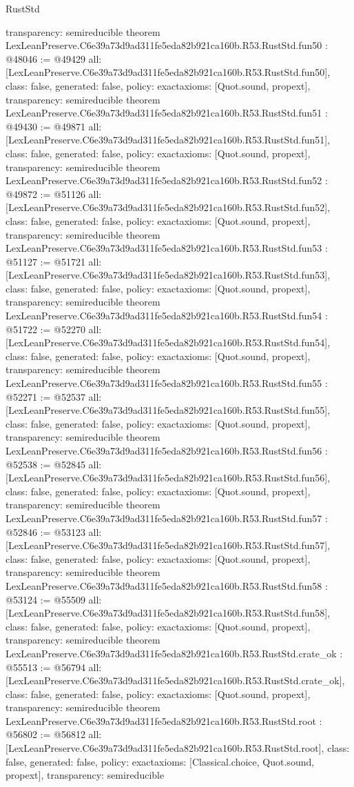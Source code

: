\begin{lexlean}{RustStd}
\begin{coremodule}
{  transparency: semireducible
}
theorem LexLeanPreserve.C6e39a73d9ad311fe5eda82b921ca160b.R53.RustStd.fun50 : @48046 := @49429 {
  all: [LexLeanPreserve.C6e39a73d9ad311fe5eda82b921ca160b.R53.RustStd.fun50],
  class: false,
  generated: false,
  policy: exact{axioms: [Quot.sound, propext]},
  transparency: semireducible
}
theorem LexLeanPreserve.C6e39a73d9ad311fe5eda82b921ca160b.R53.RustStd.fun51 : @49430 := @49871 {
  all: [LexLeanPreserve.C6e39a73d9ad311fe5eda82b921ca160b.R53.RustStd.fun51],
  class: false,
  generated: false,
  policy: exact{axioms: [Quot.sound, propext]},
  transparency: semireducible
}
theorem LexLeanPreserve.C6e39a73d9ad311fe5eda82b921ca160b.R53.RustStd.fun52 : @49872 := @51126 {
  all: [LexLeanPreserve.C6e39a73d9ad311fe5eda82b921ca160b.R53.RustStd.fun52],
  class: false,
  generated: false,
  policy: exact{axioms: [Quot.sound, propext]},
  transparency: semireducible
}
theorem LexLeanPreserve.C6e39a73d9ad311fe5eda82b921ca160b.R53.RustStd.fun53 : @51127 := @51721 {
  all: [LexLeanPreserve.C6e39a73d9ad311fe5eda82b921ca160b.R53.RustStd.fun53],
  class: false,
  generated: false,
  policy: exact{axioms: [Quot.sound, propext]},
  transparency: semireducible
}
theorem LexLeanPreserve.C6e39a73d9ad311fe5eda82b921ca160b.R53.RustStd.fun54 : @51722 := @52270 {
  all: [LexLeanPreserve.C6e39a73d9ad311fe5eda82b921ca160b.R53.RustStd.fun54],
  class: false,
  generated: false,
  policy: exact{axioms: [Quot.sound, propext]},
  transparency: semireducible
}
theorem LexLeanPreserve.C6e39a73d9ad311fe5eda82b921ca160b.R53.RustStd.fun55 : @52271 := @52537 {
  all: [LexLeanPreserve.C6e39a73d9ad311fe5eda82b921ca160b.R53.RustStd.fun55],
  class: false,
  generated: false,
  policy: exact{axioms: [Quot.sound, propext]},
  transparency: semireducible
}
theorem LexLeanPreserve.C6e39a73d9ad311fe5eda82b921ca160b.R53.RustStd.fun56 : @52538 := @52845 {
  all: [LexLeanPreserve.C6e39a73d9ad311fe5eda82b921ca160b.R53.RustStd.fun56],
  class: false,
  generated: false,
  policy: exact{axioms: [Quot.sound, propext]},
  transparency: semireducible
}
theorem LexLeanPreserve.C6e39a73d9ad311fe5eda82b921ca160b.R53.RustStd.fun57 : @52846 := @53123 {
  all: [LexLeanPreserve.C6e39a73d9ad311fe5eda82b921ca160b.R53.RustStd.fun57],
  class: false,
  generated: false,
  policy: exact{axioms: [Quot.sound, propext]},
  transparency: semireducible
}
theorem LexLeanPreserve.C6e39a73d9ad311fe5eda82b921ca160b.R53.RustStd.fun58 : @53124 := @55509 {
  all: [LexLeanPreserve.C6e39a73d9ad311fe5eda82b921ca160b.R53.RustStd.fun58],
  class: false,
  generated: false,
  policy: exact{axioms: [Quot.sound, propext]},
  transparency: semireducible
}
theorem LexLeanPreserve.C6e39a73d9ad311fe5eda82b921ca160b.R53.RustStd.crate_ok : @55513 := @56794 {
  all: [LexLeanPreserve.C6e39a73d9ad311fe5eda82b921ca160b.R53.RustStd.crate_ok],
  class: false,
  generated: false,
  policy: exact{axioms: [Quot.sound, propext]},
  transparency: semireducible
}
theorem LexLeanPreserve.C6e39a73d9ad311fe5eda82b921ca160b.R53.RustStd.root : @56802 := @56812 {
  all: [LexLeanPreserve.C6e39a73d9ad311fe5eda82b921ca160b.R53.RustStd.root],
  class: false,
  generated: false,
  policy: exact{axioms: [Classical.choice, Quot.sound, propext]},
  transparency: semireducible
}


\end{coremodule}
\end{lexlean}

